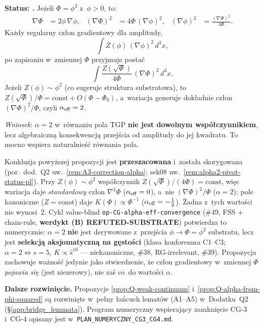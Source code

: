 \begin{proposition}[$\alpha_{\rm eff} = 2$ z~przej\'scia
  $\phi \to \Phi = \phi^2$]%
\label{prop:Q-alpha-from-phi-squared}
\textbf{Status: .}
Je\.zeli $\Phi = \phi^2$ z~$\phi > 0$, to:
\begin{align}
  \nabla\Phi &= 2\phi\,\nabla\phi, &
  (\nabla\Phi)^2 &= 4\Phi\,(\nabla\phi)^2, &
  (\nabla\phi)^2 &= \frac{(\nabla\Phi)^2}{4\Phi}.
\end{align}
Ka\.zdy regularny cz\l{}on gradientowy dla amplitudy,
\[
  \int Z(\phi)\,(\nabla\phi)^2\,d^3x,
\]
po zapisaniu w~zmiennej $\Phi$ przyjmuje posta\'c
\[
  \int \frac{Z(\sqrt{\Phi})}{4\Phi}\,(\nabla\Phi)^2\,d^3x.
\]
Je\.zeli $Z(\phi) \sim \phi^2$ (co sugeruje struktura substratowa),
to $Z(\sqrt{\Phi})/\Phi = \mathrm{const} + O(\Phi - \Phi_0)$,
a~wariacja generuje dok\l{}adnie cz\l{}on $(\nabla\Phi)^2/\Phi$,
czyli \textbf{$\alpha_{\rm eff} = 2$}.

\medskip\noindent
\textit{Wniosek}: $\alpha = 2$ w~r\'ownaniu pola TGP
\textbf{nie jest dowolnym wsp\'o\l{}czynnikiem}, lecz
algebraiczn\k{a} konsekwencj\k{a} przej\'scia od amplitudy
do jej kwadratu. To mocno wspiera naturalnie\'s\'c r\'ownania pola.
\end{proposition}

\begin{uwaga}[KOREKTA \texttt{prop:Q-alpha-from-phi-squared} --- za\l{}o\.zenie $Z\sim\phi^2$ daje $\alpha=0$, nie~$2$ (\#31/\#38/\#39/\#49)]
\label{rem:Q-alpha-overclaim-correction}
Konkluzja powy\.zszej propozycji jest \textbf{przeszacowana} i~zosta\l{}a skorygowana
(por.\ dod.~Q2 uw.~\ref{rem:A3-correction-alpha}; sek08 uw.~\ref{rem:alpha2-pivot-status-pl}).
Przy $Z(\phi)\sim\phi^2$ wsp\'o\l{}czynnik $Z(\sqrt{\Phi})/(4\Phi)=\mathrm{const}$, wi\k{e}c
wariacja daje \emph{standardowy} cz\l{}on $\nabla^2\Phi$ ($\alpha_{\rm eff}=0$), a~nie
$(\nabla\Phi)^2/\Phi$ ($\alpha=2$); pole kanoniczne ($Z=\mathrm{const}$) daje
$K(\Phi)\propto\Phi^{-1}$ ($\alpha_{\rm eff}=-\tfrac12$). \.Zadna z~tych warto\'sci nie wynosi~$2$.
Cykl value-blind \texttt{op-CG-alpha-eff-convergence} (\#49, FSS + chain-rule, \textbf{werdykt (B)
REFUTED-SUBSTRATE}) potwierdza to numerycznie: $\alpha=2$ \textbf{nie} jest derywowane z~przej\'scia
$\phi\to\Phi=\phi^2$ substratu, lecz jest \textbf{selekcj\k{a} aksjomatyczn\k{a} na g\k{e}sto\'sci}
(klasa konforemna C1--C3; $\alpha=2\Leftrightarrow s=5$, $K\propto\hat s^{10}$ --- niekanoniczne,
\#38, RG-irrelevant, \#39). Propozycja zachowuje wa\.zno\'s\'c jedynie jako stwierdzenie, \.ze cz\l{}on
gradientowy w~zmiennej $\Phi$ \emph{pojawia si\k{e}} (jest niezerowy), nie za\'s co~do warto\'sci $\alpha$.
\end{uwaga}

\medskip\noindent
\textbf{Dalsze rozwinięcie.}
Propozycje \ref{prop:Q-weak-continuum} i~\ref{prop:Q-alpha-from-phi-squared}
s\k{a} rozwinięte w~pe\l{}ny \l{}a\'ncuch lemat\'ow (A1--A5)
w~Dodatku~Q2 (\S\ref{app:bridge_lemmata}).
Program numeryczny wspieraj\k{a}cy zamkni\k{e}cie CG-3 i~CG-4
opisany jest w~\texttt{PLAN\_NUMERYCZNY\_CG3\_CG4.md}.
